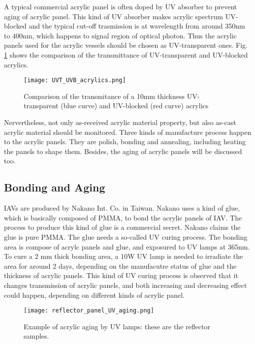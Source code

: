 A typical commercial acrylic panel is often doped by UV absorber
to prevent aging of acrylic panel. This kind of UV absorber makes acrylic spectrum
UV-blocked and the typical cut-off trasmission is at wavelength from around 350nm to 400nm,
which happens to signal region of optical photon.
Thus the acrylic panels used for the acrylic vessels should be chosen as
UV-transparent ones. Fig. \ref{fig:UVTUVBAcrylics} shows the comparison of the transmittance of UV-transparent
and UV-blocked acrylics.


\begin{figure}
    \centering
    \texttt{[image: UVT\_UVB\_acrylics.png]}
    \caption{Comparison of the transmitance of a 10mm thickness UV-transparent (blue curve) and UV-blocked (red curve) acrylics}
    \label{fig:UVTUVBAcrylics}
    \end{figure}



Nervertheless, not only as-received acrylic material property, but also as-cast
acrylic material should be monitored. Three kinds of manufacture process happen to the acrylic panels.
They are polish, bonding and annealing, including heating the panels to shape them. Besides,
the aging of acrylic panels will be discussed too.


\subsection {Bonding and Aging}

IAVs are produced by Nakano Int. Co. in Taiwan. Nakano uses a kind of glue, which is basically
composed of PMMA, to bond the acrylic panels of IAV. The process to produce this kind of glue is a commercial
secret. Nakano claims the glue is pure PMMA. The glue needs a so-called UV curing process. The bonding area
is compose of acrylc panels and glue, and exposured to UV lamps at 365nm. To cure a 2 mm thick bonding
area, a 10W UV lamp is needed to irradiate the area for around 2 days, depending on the manufacutre status of glue
and the thickness of acrylic panels. This kind of UV curing process is observed that it changes transmission of acrylic panels,
and both increasing and decreasing effect could happen, depending on different kinds of acrylic panel.


\begin{figure}
    \centering
    \texttt{[image: reflector\_panel\_UV\_aging.png]}
    \caption [Example of acrylic aging by UV lamps]
    {Example of acrylic aging by UV lamps: these are the reflector samples.\cite{DocDB:3691v1}}
    \label{ReflectorAging}
    \end{figure}



